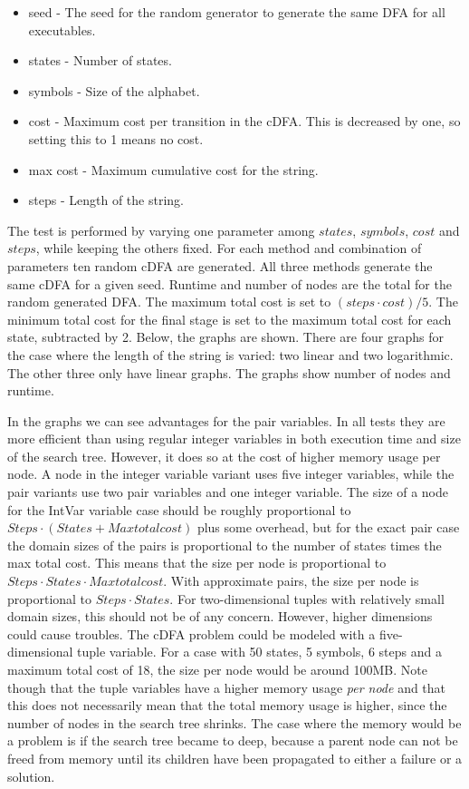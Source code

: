 \documentclass[a4paper,11pt]{article}
\begin{document}
\begin{itemize}
\item{seed} - The seed for the random generator to generate the same DFA for all executables.
\item{states} - Number of states.
\item{symbols} - Size of the alphabet.
\item{cost} - Maximum cost per transition in the cDFA. This is decreased by one, so setting this to 1 means no cost.
\item{max cost} - Maximum cumulative cost for the string.
\item{steps} - Length of the string.
\end{itemize}
The test is performed by varying one parameter among $states$, $symbols$, $cost$ and $steps$, while keeping the others fixed. For each method and combination of parameters ten random cDFA are generated. All three methods generate the same cDFA for a given seed. Runtime and number of nodes are the total for the random generated DFA. The maximum total cost is set to $(steps\cdot cost)/5$. The minimum total cost for the final stage is set to the maximum total cost for each state, subtracted by 2. Below, the graphs are shown. There are four graphs for the case where the length of the string is varied: two linear and two logarithmic. The other three only have linear graphs. The graphs show number of nodes and runtime.






%

In the graphs we can see advantages for the pair variables. In all tests they are more efficient than using regular integer variables in both execution time and size of the search tree. However, it does so at the cost of higher memory usage per node. A node in the integer variable variant uses five integer variables, while the pair variants use two pair variables and one integer variable. The size of a node for the IntVar variable case should be roughly proportional to $Steps\cdot (States + Maxtotalcost)$ plus some overhead, but for the exact pair case the domain sizes of the pairs is proportional to the number of states times the max total cost. This means that the size per node is proportional to $Steps\cdot States\cdot Maxtotalcost$. With approximate pairs, the size per node is proportional to $Steps\cdot States$. For two-dimensional tuples with relatively small domain sizes, this should not be of any concern. However, higher dimensions could cause troubles. The cDFA problem could be modeled with a five-dimensional tuple variable. For a case with 50 states, 5 symbols, 6 steps and a maximum total cost of 18, the size per node would be around 100MB. Note though that the tuple variables have a higher memory usage \textit{per node} and that this does not necessarily mean that the total memory usage is higher, since the number of nodes in the search tree shrinks. The case where the memory would be a problem is if the search tree became to deep, because a parent node can not be freed from memory until its children have been propagated to either a failure or a solution.
\end{document}
